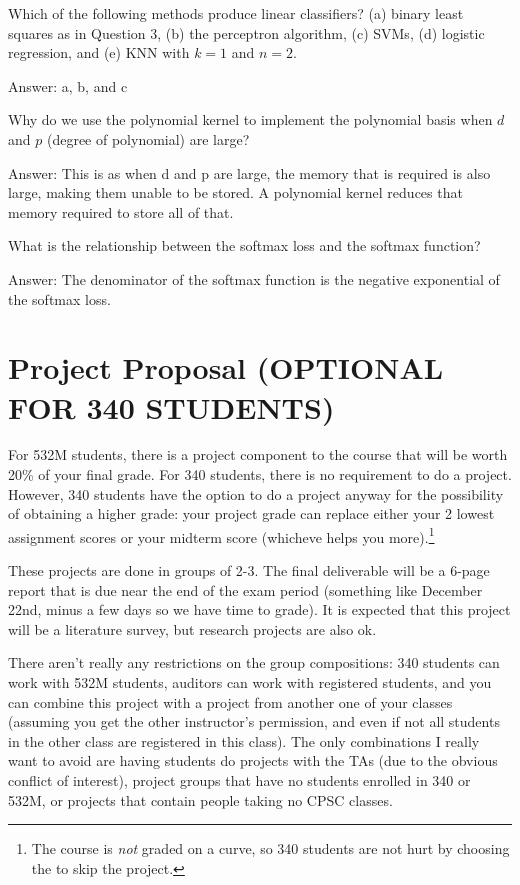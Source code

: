 \documentclass{article}
\def\ans#1{\par\gre{Answer: #1}}
\def\blu#1{{\color{blu}#1}}
\def\gre#1{{\color{gre}#1}}
\begin{document}
{\item Which of the following methods produce linear classifiers? (a) binary least squares as in Question 3, (b) the perceptron algorithm, (c) SVMs, (d) logistic regression, and (e) KNN with $k=1$ and $n=2$.
\ans{a, b, and c}
\item Why do we use the polynomial kernel to implement the polynomial basis when $d$ and $p$ (degree of polynomial) are large?
\ans{This is as when d and p are large, the memory that is required is also large, making them unable to be stored. A polynomial kernel reduces that memory required to store all of that.}
\item What is the relationship between the softmax loss and the softmax function?
\ans{The denominator of the softmax function is the negative exponential of the softmax loss.}
}

\pagebreak

\section*{Project Proposal (OPTIONAL FOR 340 STUDENTS)}

For 532M students, there is a project component to the course that will be worth 20\% of your final grade. For 340 students, there is no requirement to do a project. However, 340 students have the option to do a project anyway for the possibility of obtaining a higher grade: your project grade can replace either your 2 lowest assignment scores or your midterm score (whicheve helps you more).\footnote{The course is \emph{not} graded on a curve, so 340 students are not hurt by choosing the to skip the project.}

These projects are done in \blu{groups of 2-3}. The final deliverable will be a \blu{6-page report that is due near the end of the exam period} (something like December 22nd, minus a few days so we have time to grade). It is expected that this project will be a literature survey, but research projects are also ok.

There aren't really any restrictions on the group compositions: 340 students can work with 532M students, auditors can work with registered students, and you can combine this project with a project from another one of your classes (assuming you get the other instructor's permission, and even if not all students in the other class are registered in this class). The only combinations I really want to avoid are having students do projects with the TAs (due to the obvious conflict of interest), project groups that have no students enrolled in 340 or 532M, or projects that contain people taking no CPSC classes.
\end{document}
